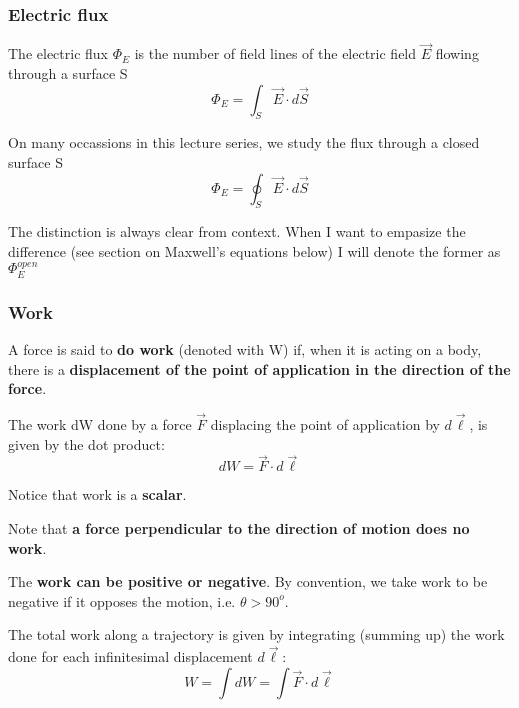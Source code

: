 \documentclass[english,11pt]{article}
\begin{document}
\subsubsection*{\bf Electric flux}
          \begin{itemize}
          {\small
             \item The electric flux $\Phi_E$ is the number of field lines of the electric field $\vec{E}$
                   flowing through a surface S
                \begin{equation*}
                  \Phi_E = \int_{S} \vec{E} \cdot d\vec{S}
                \end{equation*}
            \item On many occassions in this lecture series, we study the flux through a closed surface S
                \begin{equation*}
                  \Phi_E = \oint_{S} \vec{E} \cdot d\vec{S}
                \end{equation*}
            \item The distinction is always clear from context. When I want to empasize the difference
                  (see section on Maxwell's equations below) I will denote the former as $\Phi^{open}_{E}$
          }
          \end{itemize}


\subsubsection*{\bf Work}

        \begin{itemize}
        {\small
          \item
          A force is said to {\bf do work} (denoted with W) if, when it is acting on a body,
          there is a {\bf displacement of the point of application in the direction of the force}.
          \item
          The work dW done by a force $\vec{F}$ displacing the point of application by $d\vec{\ell}$,
          is given by the dot product:
              \begin{equation*}
                dW = \vec{F} \cdot d\vec{\ell}
              \end{equation*}
          \item
          Notice that work is a {\bf scalar}.
          \item
          Note that {\bf a force perpendicular to the direction of motion does no work}.
          \item
          The {\bf work can be positive or negative}.
          By convention, we take work to be negative if it opposes the motion, i.e. $\theta > 90^{o}$.
          \item
          The total work along a trajectory is given by integrating (summing up) the work done for
          each infinitesimal displacement $d\vec{\ell}$:
             \begin{equation*}
                W = \int dW = \int \vec{F} \cdot d\vec{\ell}
             \end{equation*}
       }
       \end{itemize}
\end{document}

